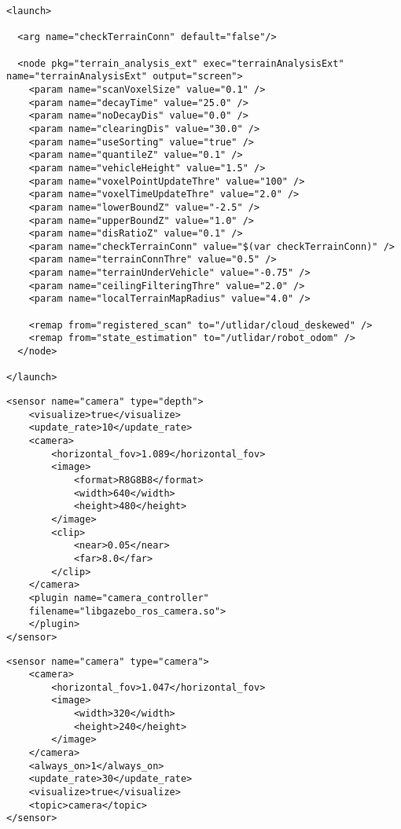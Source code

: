 \newpage
\begin{lstlisting}[style=yaml, caption={Terrain analysis extended launch file}, label={lst:terrain_analysis_ext_launch}]
<launch>

  <arg name="checkTerrainConn" default="false"/>

  <node pkg="terrain_analysis_ext" exec="terrainAnalysisExt" name="terrainAnalysisExt" output="screen">
    <param name="scanVoxelSize" value="0.1" />
    <param name="decayTime" value="25.0" />
    <param name="noDecayDis" value="0.0" />
    <param name="clearingDis" value="30.0" />
    <param name="useSorting" value="true" />
    <param name="quantileZ" value="0.1" />
    <param name="vehicleHeight" value="1.5" />
    <param name="voxelPointUpdateThre" value="100" />
    <param name="voxelTimeUpdateThre" value="2.0" />
    <param name="lowerBoundZ" value="-2.5" />
    <param name="upperBoundZ" value="1.0" />
    <param name="disRatioZ" value="0.1" />
    <param name="checkTerrainConn" value="$(var checkTerrainConn)" />
    <param name="terrainConnThre" value="0.5" />
    <param name="terrainUnderVehicle" value="-0.75" />
    <param name="ceilingFilteringThre" value="2.0" />
    <param name="localTerrainMapRadius" value="4.0" />

    <remap from="registered_scan" to="/utlidar/cloud_deskewed" />
    <remap from="state_estimation" to="/utlidar/robot_odom" />
  </node>

</launch>
\end{lstlisting}

\newpage
\vspace{10pt }
\begin{minipage}{0.9\textwidth}      
\begin{lstlisting}[style=xmlStyle, caption={Depth Camera Sensor Configuration}, label={lst:depth_camera_sensor}]
<sensor name="camera" type="depth">
    <visualize>true</visualize>
    <update_rate>10</update_rate>
    <camera>
        <horizontal_fov>1.089</horizontal_fov>
        <image>
            <format>R8G8B8</format>
            <width>640</width>
            <height>480</height>
        </image>
        <clip>
            <near>0.05</near>
            <far>8.0</far>
        </clip>
    </camera>
    <plugin name="camera_controller" 
    filename="libgazebo_ros_camera.so">
    </plugin>
</sensor>
\end{lstlisting}
\end{minipage}

\newpage
\vspace{10pt }
\begin{minipage}{0.9\textwidth}
\begin{lstlisting}[style=xmlStyle, caption={Camera Sensor Configuration}, label={lst:camera_sensor}]
<sensor name="camera" type="camera">
    <camera>
        <horizontal_fov>1.047</horizontal_fov>
        <image>
            <width>320</width>
            <height>240</height>
        </image>
    </camera>
    <always_on>1</always_on>
    <update_rate>30</update_rate>
    <visualize>true</visualize>
    <topic>camera</topic>
</sensor>
\end{lstlisting}
\end{minipage}

